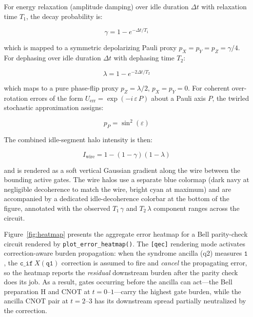 \documentclass[10pt,twocolumn]{article}
\begin{document}
For energy relaxation (amplitude damping) over idle duration
$\Delta t$ with relaxation time $T_1$, the decay probability is:

\begin{equation}
    \gamma = 1 - e^{-\Delta t / T_1}
    \label{eq:t1_decay}
\end{equation}

\noindent
which is mapped to a symmetric depolarizing Pauli proxy
$p_X = p_Y = p_Z = \gamma / 4$.
For dephasing over idle duration $\Delta t$ with dephasing time $T_2$:

\begin{equation}
    \lambda = 1 - e^{-2\Delta t / T_2}
    \label{eq:t2_dephasing}
\end{equation}

\noindent
which maps to a pure phase-flip proxy $p_Z = \lambda/2$,
$p_X = p_Y = 0$.
For coherent over-rotation errors of the form
$U_\mathrm{err} = \exp(-i\,\varepsilon\, P)$ about a Pauli axis $P$,
the twirled stochastic approximation assigns:

\begin{equation}
    p_P = \sin^2(\varepsilon)
    \label{eq:coherent_twirl}
\end{equation}

\noindent
The combined idle-segment halo intensity is then:

\begin{equation}
    I_\mathrm{wire} = 1 - (1 - \gamma)(1 - \lambda)
    \label{eq:wire_intensity}
\end{equation}

\noindent
and is rendered as a soft vertical Gaussian gradient along the wire
between the bounding active gates.
The wire halos use a separate blue colormap (dark navy at
negligible decoherence to match the wire, bright cyan at maximum) and are accompanied
by a dedicated idle-decoherence colorbar at the bottom of the figure,
annotated with the observed $T_1\,\gamma$ and $T_2\,\lambda$
component ranges across the circuit.

Figure~\ref{fig:heatmap} presents the aggregate error heatmap
for a Bell parity-check circuit rendered by \texttt{plot\_error\_heatmap()}.
The \texttt{[qec]} rendering mode activates correction-aware burden
propagation: when the syndrome ancilla (q2) measures $\mathtt{1}$, the
$\mathtt{c\_if}~X(\mathtt{q1})$ correction is assumed to fire and
\emph{cancel} the propagating error, so the heatmap reports the
\emph{residual} downstream burden after the parity check does its job.
As a result, gates occurring before the ancilla can act---the Bell
preparation H and CNOT at $t{=}0$--$1$---carry the highest gate burden,
while the ancilla CNOT pair at $t{=}2$--$3$ has its downstream spread
partially neutralized by the correction.
\end{document}
